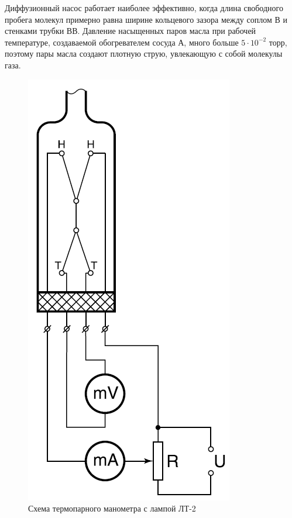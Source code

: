 \documentclass[a4paper, 12pt]{article}
\begin{document}
Диффузионный насос работает наиболее эффективно, когда длина свободного пробега молекул примерно равна ширине кольцевого зазора между соплом В и стенками трубки ВВ. Давление насыщенных паров масла при рабочей температуре, создаваемой обогревателем сосуда А, много больше $5\cdot 10^{-2}$ торр, поэтому пары масла создают плотную струю, увлекающую с собой молекулы газа.

\begin{figure}
 	\begin{center}
 		\includegraphics[width=0.8\linewidth]{6.png}
 		\caption{Схема термопарного манометра с лампой ЛТ-2}
 		\label{fig:Схема термопары}
 	\end{center}
 \end{figure}
 
\end{document}

